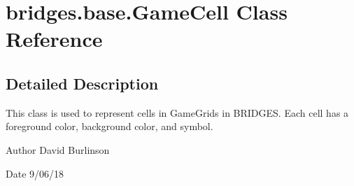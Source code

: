 \hypertarget{classbridges_1_1base_1_1_game_cell}{}\section{bridges.\+base.\+Game\+Cell Class Reference}
\label{classbridges_1_1base_1_1_game_cell}


\subsection{Detailed Description}
This class is used to represent cells in Game\+Grids in B\+R\+I\+D\+G\+ES. Each cell has a foreground color, background color, and symbol. 

\begin{DoxyAuthor}{Author}
David Burlinson 
\end{DoxyAuthor}
\begin{DoxyDate}{Date}
9/06/18 
\end{DoxyDate}
